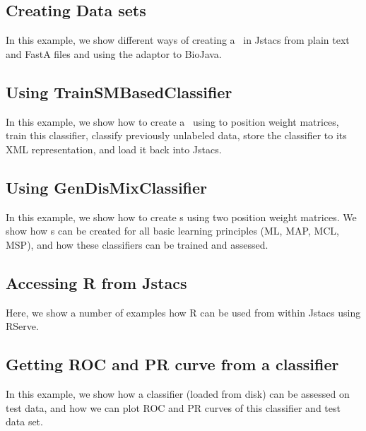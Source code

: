 \subsection{Creating Data sets}
In this example, we show different ways of creating a \DataSet~in Jstacs from plain text and FastA files and using the adaptor to BioJava.
\renewcommand{\codefile}{./recipes/DataLoader.java}
\setcounter{off}{42}

\subsection{Using TrainSMBasedClassifier}
In this example, we show how to create a \TrainSMBasedClassifier~using to position weight matrices, train this classifier, classify previously unlabeled data, store the classifier to its XML representation, and load it back into Jstacs.
\renewcommand{\codefile}{./recipes/TrainSMBasedClassifierTest.java}
\setcounter{off}{53}

\subsection{Using GenDisMixClassifier}
In this example, we show how to create \GenDisMixClassifier s using two position weight matrices. We show how \GenDisMixClassifier s can be created for all basic learning principles (ML, MAP, MCL, MSP), and how these classifiers can be trained and assessed.
\renewcommand{\codefile}{./recipes/GenDisMixClassifierTest.java}
\setcounter{off}{54}

\subsection{Accessing R from Jstacs}
Here, we show a number of examples how R can be used from within Jstacs using RServe.
\renewcommand{\codefile}{./recipes/RserveTest.java}
\setcounter{off}{40}

\subsection{Getting ROC and PR curve from a classifier}
In this example, we show how a classifier (loaded from disk) can be assessed on test data, and how we can plot ROC and PR curves of this classifier and test data set.
\renewcommand{\codefile}{./recipes/CurvePlotter.java}
\setcounter{off}{53}

